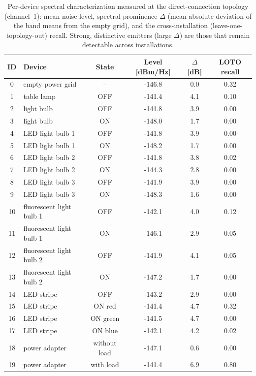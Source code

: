 \begin{longtable}{|c|p{}|c|c|c|c|}
\caption{Per-device spectral characterization measured at the direct-connection topology (channel~1): mean noise level, spectral prominence $\Delta$ (mean absolute deviation of the band means from the empty grid), and the cross-installation (leave-one-topology-out) recall. Strong, distinctive emitters (large $\Delta$) are those that remain detectable across installations.\label{tab:device_spectral}}\\
\hline
ID & Device & State & Level [dBm/Hz] & $\Delta$ [dB] & LOTO recall \\ \hline\hline \endhead
0 & empty power grid & -- & -146.8 & 0.0 & 0.32 \\ \hline
1 & table lamp & OFF & -141.4 & 4.1 & 0.10 \\ \hline
2 & light bulb & OFF & -141.8 & 3.9 & 0.00 \\ \hline
3 & light bulb & ON & -148.0 & 1.7 & 0.00 \\ \hline
4 & LED light bulb 1 & OFF & -141.8 & 3.9 & 0.00 \\ \hline
5 & LED light bulb 1 & ON & -148.2 & 1.7 & 0.00 \\ \hline
6 & LED light bulb 2 & OFF & -141.8 & 3.8 & 0.02 \\ \hline
7 & LED light bulb 2 & ON & -144.3 & 2.8 & 0.00 \\ \hline
8 & LED light bulb 3 & OFF & -141.9 & 3.9 & 0.00 \\ \hline
9 & LED light bulb 3 & ON & -148.3 & 1.6 & 0.00 \\ \hline
10 & fluorescent light bulb 1 & OFF & -142.1 & 4.0 & 0.12 \\ \hline
11 & fluorescent light bulb 1 & ON & -146.1 & 2.9 & 0.05 \\ \hline
12 & fluorescent light bulb 2 & OFF & -141.9 & 4.1 & 0.05 \\ \hline
13 & fluorescent light bulb 2 & ON & -147.2 & 1.7 & 0.00 \\ \hline
14 & LED stripe & OFF & -143.2 & 2.9 & 0.00 \\ \hline
15 & LED stripe & ON red & -141.4 & 4.7 & 0.32 \\ \hline
16 & LED stripe & ON green & -141.5 & 4.7 & 0.00 \\ \hline
17 & LED stripe & ON blue & -142.1 & 4.2 & 0.02 \\ \hline
18 & power adapter & without load & -147.1 & 0.6 & 0.00 \\ \hline
19 & power adapter & with load & -141.4 & 6.9 & 0.80 \\ \hline

\end{longtable}
